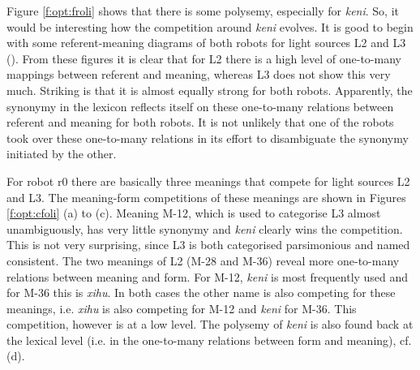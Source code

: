 Figure \ref{f:opt:froli} shows that there is some polysemy, especially for {\it keni}. So, it would be interesting how the competition around {\it keni} evolves. It is good to begin with some referent-meaning diagrams of both robots for light sources L2 and L3 (). From these figures it is clear that for L2 there is a high level of one-to-many mappings between referent and meaning, whereas L3 does not show this very much. Striking is that it is almost equally strong for both robots. Apparently, the synonymy in the lexicon reflects itself on these one-to-many relations between referent and meaning for both robots. It is not unlikely that one of the robots took over these one-to-many relations in its effort to disambiguate the synonymy initiated by the other. 

For robot r0 there are basically three meanings that compete for light sources L2 and L3. The meaning-form competitions of these meanings are shown in Figures \ref{f:opt:cfoli} (a) to (c). Meaning M-12, which is used to categorise L3 almost unambiguously, has very little synonymy and {\it keni} clearly wins the competition. This is not very surprising, since L3 is both categorised  parsimonious and named consistent. The two meanings of L2 (M-28 and M-36) reveal more one-to-many relations between meaning and form. For M-12, {\it keni} is most frequently used and for M-36 this is {\it xihu}. In both cases the other name is also competing for these meanings, i.e. {\it xihu} is also competing for M-12 and {\it keni} for M-36. This competition, however is at a low level. The polysemy of {\it keni} is also found back at the lexical level (i.e. in the one-to-many relations between form and meaning), cf.  (d). 


